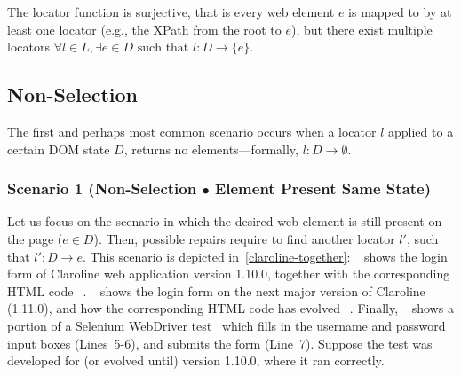 The locator function is surjective, that is every web element $e$ is mapped to by at least one locator (e.g., the XPath from the root to $e$), but there exist multiple locators {$\displaystyle \forall l\in L,\exists e\in D{\text{ such that }} l: D \rightarrow \{e\}$}.

%

\subsection{Non-Selection}\label{sec:nonselection}

The first and perhaps most common scenario occurs when a locator $l$ applied to a certain DOM state $D$, returns no elements---formally, $l: D \rightarrow \emptyset$. 
%

\subsubsection{Scenario 1 (Non-Selection $\bullet$ Element Present Same State)} 
Let us focus on the scenario in which the desired web element is still present on the page ($e \in D$). 
Then, possible repairs require to find another locator $l'$, such that $l': D \rightarrow e$.
This scenario is depicted in~\autoref{claroline-together}: \textcircled{}~shows the login form of Claroline web application version 1.10.0, together with the corresponding HTML code~\textcircled{}. \textcircled{}~shows the login form on the next major version of Claroline (1.11.0), and how the corresponding HTML code has evolved~\textcircled{}. 
Finally,~\textcircled{} shows a portion of a Selenium WebDriver test~\cite{selenium} which fills in the username and password input boxes (Lines~5-6), and submits the form (Line~7). Suppose the test was developed for (or evolved until) version 1.10.0, where it ran correctly.

